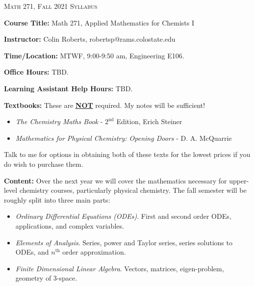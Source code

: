 \documentclass[12pt]{amsbook}
\begin{document}

\SetWatermarkText{
\begin{minipage}[c][8cm]{8cm}
\begin{center}
 
\end{center}
\end{minipage}
}




\begin{center}
   \textsc{\large Math 271, Fall 2021 Syllabus}
\end{center}
\vspace{.5cm}

\textbf{Course Title:} Math 271, Applied Mathematics for Chemists I

\textbf{Instructor:} Colin Roberts, robertsp@rams.colostate.edu

\textbf{Time/Location:} MTWF, 9:00-9:50 am, Engineering E106.  

\textbf{Office Hours:} TBD.

\textbf{Learning Assistant Help Hours:} TBD.

\textbf{Textbooks:} These are \underline{\textbf{NOT}} required.  My notes will be sufficient!
\begin{itemize}
    \item \emph{The Chemistry Maths Book} - $2^{\text{nd}}$ Edition, Erich Steiner
    \item \emph{Mathematics for Physical Chemistry: Opening Doors} - D. A. McQuarrie
\end{itemize}
Talk to me for options in obtaining both of these texts for the lowest prices if you do wish to purchase them. 

\textbf{Content:} Over the next year we will cover the mathematics necessary for upper-level chemistry courses, particularly physical chemistry. The fall semester will be roughly split into three main parts:
\begin{itemize}
    \item \emph{Ordinary Differential Equations (ODEs)}. First and second order ODEs, applications, and complex variables.
    \item \emph{Elements of Analysis}. Series, power and Taylor series, series solutions to ODEs, and $n^\textrm{th}$ order approximation.
    \item \emph{Finite Dimensional Linear Algebra}. Vectors, matrices, eigen-problem, geometry of 3-space.
\end{itemize}
\end{document}
